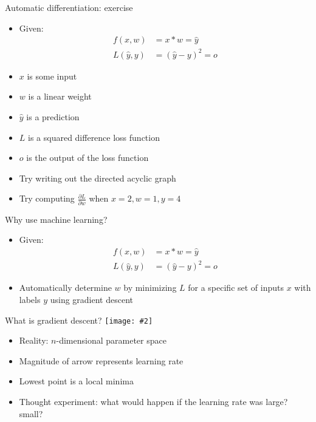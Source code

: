 \documentclass[hyperref={pdfpagelabels=false},12pt]{beamer}
\newcommand{\ig}[2]{\texttt{[image: \#2]}}
\begin{document}
\begin{frame}{Automatic differentiation: exercise}
  \begin{itemize}
      \item Given:
        \begin{align*}
          f(x, w) &= x * w = \hat{y} \\
          L(\hat{y}, y) &= (\hat{y} - y)^2 = o
        \end{align*}
      \item $x$ is some input
      \item $w$ is a linear weight
      \item $\hat{y}$ is a prediction
      \item $L$ is a squared difference loss function
      \item $o$ is the output of the loss function
      \item Try writing out the directed acyclic graph
      \item Try computing $\frac{\partial L}{\partial w}$ when $x=2, w=1, y=4$
  \end{itemize}
\end{frame}

\begin{frame}{Why use machine learning?}
  \begin{itemize}
    \item Given:
      \begin{align*}
        f(x, w) &= x * w = \hat{y} \\
        L(\hat{y}, y) &= (\hat{y} - y)^2 = o
      \end{align*}
    \item Automatically determine $w$ by minimizing $L$ for a specific set of
      inputs $x$ with labels $y$ using gradient descent
  \end{itemize}
\end{frame}

\begin{frame}{What is gradient descent?}
  \vspace*{-0.5cm}
  \centering
  \ig{0.4}{figures/gradient-descent.png}
  \begin{itemize}
    \item Reality: $n$-dimensional parameter space
    \item Magnitude of arrow represents learning rate
    \item Lowest point is a local minima
    \item Thought experiment: what would happen if the learning rate was large?
      small?
  \end{itemize}
\end{frame}
\end{document}
